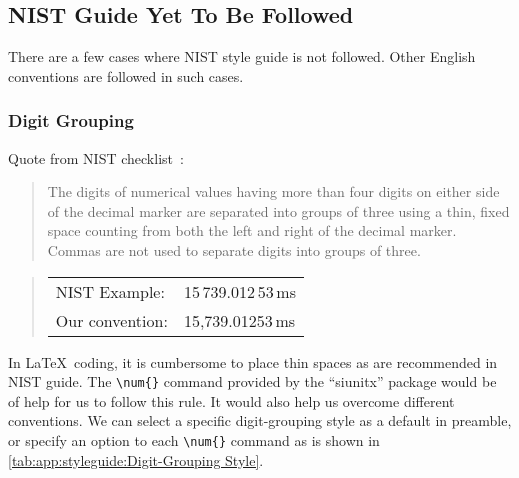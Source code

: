 \subsection{NIST Guide Yet To Be Followed}
\label{sec:app:styleguide:NIST Guides Yet To Be Followed}

There are a few cases where NIST style guide is not followed.
Other English conventions are followed in such cases.

\subsubsection{Digit Grouping}
\label{sec:app:styleguide:Digit Grouping}

Quote from NIST checklist~\cite[\#16]{NIST:UnitCheckList}:

\begin{quote}
  The digits of numerical values having more than four digits on either
  side of the decimal marker are separated into groups of three using
  a thin, fixed space counting from both the left and right of the decimal
  marker.
  Commas are not used to separate digits into groups of three.
\end{quote}

\begin{quote}
\begin{tabular}{ll}
  NIST Example:& 15\,739.012\,53\,ms\\
  Our convention:& 15,739.01253\,ms\\
\end{tabular}
\end{quote}

In \LaTeX\ coding, it is cumbersome to place thin spaces as are recommended
in NIST guide.
The \verb|\num{}| command provided by the ``siunitx'' package would be
of help for us to follow this rule.
It would also help us overcome different conventions.
We can select a specific digit-grouping style as
a default in preamble, or specify an option to each \verb|\num{}|
command as is shown in
\cref{tab:app:styleguide:Digit-Grouping Style}.

